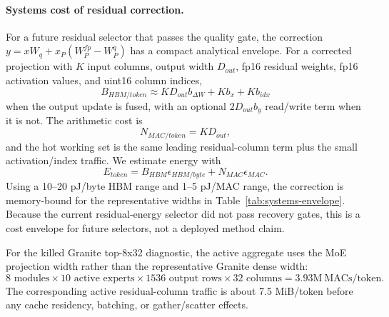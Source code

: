 \paragraph{Systems cost of residual correction.}
For a future residual selector that passes the quality gate, the correction
\(y=xW_q+x_P(W^{fp}_P-W^q_P)\) has a compact analytical envelope.  For a
corrected projection with \(K\) input columns, output width \(D_{out}\), fp16
residual weights, fp16 activation values, and uint16 column indices,
\[
B_{HBM/token}\approx K D_{out} b_{\Delta W}+K b_x+K b_{idx}
\]
when the output update is fused, with an optional \(2D_{out}b_y\) read/write
term when it is not. The arithmetic cost is
\[
N_{MAC/token}=K D_{out},
\]
and the hot working set is the same leading residual-column term plus the small
activation/index traffic. We estimate energy with
\[
E_{token}=B_{HBM}\epsilon_{HBM/byte}+N_{MAC}\epsilon_{MAC}.
\]
Using a 10--20 pJ/byte HBM range and 1--5 pJ/MAC range, the correction is
memory-bound for the representative widths in Table~\ref{tab:systems-envelope}.
Because the current residual-energy selector did not pass recovery gates, this
is a cost envelope for future selectors, not a deployed method claim.

For the killed Granite top-8x32 diagnostic, the active aggregate uses the MoE
projection width rather than the representative Granite dense width:
\[
8 \text{ modules} \times 10 \text{ active experts} \times
1536 \text{ output rows} \times 32 \text{ columns}
= 3.93\mathrm{M}\ \mathrm{MACs/token}.
\]
The corresponding active residual-column traffic is about 7.5 MiB/token before
any cache residency, batching, or gather/scatter effects.
